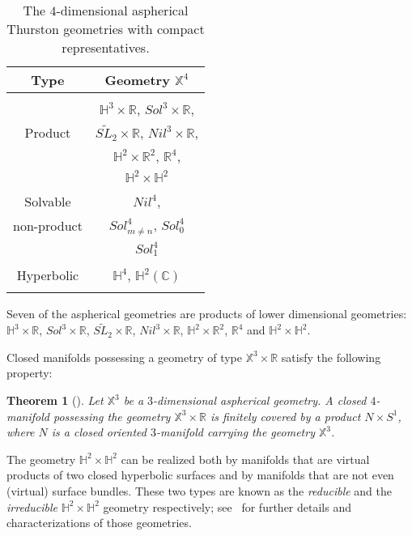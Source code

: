 \documentclass[12pt]{amsart}
\newtheorem{thm}{Theorem}[section]
\theoremstyle{remark}
\begin{document}
\begin{table}
\centering
{\small
\begin{tabular}{c|c}
Type & Geometry $\mathbb{X}^4$\\
\hline
& \\
          & $\mathbb{H}^3\times\mathbb{R}$, $Sol^3\times{\mathbb{R}}$, \\
Product   & $\widetilde{SL_2}\times\mathbb{R}$, $Nil^3\times\mathbb{R}$, \\
          & $\mathbb{H}^2\times\mathbb{R}^2$, ${\mathbb{R}}^4$, \\
          & $\mathbb{H}^2\times\mathbb{H}^2$ \\&\\
Solvable    & $Nil^4$, \\
non-product & $Sol^4_{m \neq n}$, $Sol^4_0$\\
            & $Sol^4_1$\\&\\
Hyperbolic & $\mathbb{H}^4$, $\mathbb{H}^2(\mathbb{C})$\\&\\            
\end{tabular}}
\vspace{9pt}
\caption{{\small The $4$-dimensional aspherical Thurston geometries with compact representatives.}}\label{table:4geom}
\end{table}

\medskip

 Seven of the aspherical geometries are products of lower dimensional geometries: $\mathbb{H}^3 \times {\mathbb{R}}$,
$Sol^3 \times {\mathbb{R}}$,
$\widetilde{SL_2} \times {\mathbb{R}}$, $Nil^3 \times {\mathbb{R}}$, $\mathbb{H}^2 \times {\mathbb{R}}^2$, ${\mathbb{R}}^4$ and $\mathbb{H}^2 \times \mathbb{H}^2$. 

Closed manifolds possessing a geometry of type $\mathbb{X}^3 \times {\mathbb{R}}$ satisfy the following property:

\begin{thm}[]\label{t:hillmanproducts}
 Let $\mathbb{X}^3$ be a $3$-dimensional aspherical geometry. A closed $4$-manifold possessing the geometry $\mathbb{X}^3 \times {\mathbb{R}}$ is finitely
covered by a product $N \times S^1$, where $N$ is a closed oriented $3$-manifold carrying the geometry $\mathbb{X}^3$.
\end{thm}

The geometry $\mathbb{H}^2 \times \mathbb{H}^2$ can be realized both by manifolds that are virtual products of two closed hyperbolic
surfaces and by manifolds that are not even (virtual) surface bundles. These two types are known as the {\em reducible} and the {\em irreducible}
$\mathbb{H}^2 \times \mathbb{H}^2$ geometry respectively; see~\cite[Section 9.5]{Hillman} for further details and characterizations of those geometries.
\end{document}
